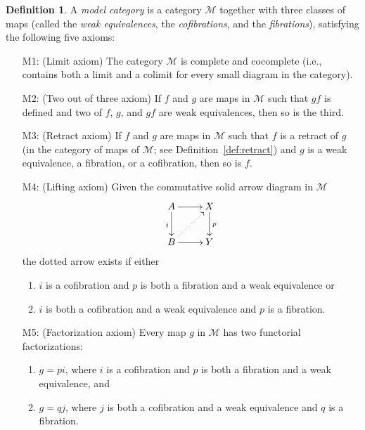 \documentclass{amsart}
\numberwithin{equation}{section}
\theoremstyle{slplain}
\theoremstyle{definition}
\newtheorem{defn}[equation]{Definition} %
\theoremstyle{remark}
\newcommand{\defref}{Definition~\ref}
\newcommand{\cat}[1]{\mathcal{#1}}
\begin{document}
\begin{defn}
  \label{def:ModCat}
  A \emph{model category} is a category $\cat M$ together with three
  classes of maps (called the \emph{weak equivalences}, the
  \emph{cofibrations}, and the \emph{fibrations}), satisfying the
  following five axioms:
  \begin{itemize}
  \item[M1:] (Limit axiom) The category $\cat M$ is complete and
    cocomplete (i.e., contains both a limit and a colimit for every
    small diagram in the category).
  \item[M2:] (Two out of three axiom) If $f$ and $g$ are maps in $\cat
    M$ such that $gf$ is defined and two of $f$, $g$, and $gf$ are
    weak equivalences, then so is the third.
  \item[M3:] (Retract axiom) If $f$ and $g$ are maps in $\cat M$ such
    that $f$ is a retract of $g$ (in the category of maps of $\cat M$;
    see \defref{def:retract}) and $g$ is a weak equivalence, a
    fibration, or a cofibration, then so is $f$.
  \item[M4:] (Lifting axiom) Given the commutative solid arrow diagram
    in $\cat M$
    \begin{displaymath}
      \xymatrix{
        {A} \ar[r] \ar[d]_{i} 
          & {X} \ar[d]^{p}\\
        {B} \ar@{.>}[ur] \ar[r]  
          & {Y}
      }
    \end{displaymath}
    the dotted arrow exists if either
    \begin{enumerate}
    \item $i$ is a cofibration and $p$ is both a fibration and a weak
      equivalence or
    \item $i$ is both a cofibration and a weak equivalence and $p$ is
      a fibration.
    \end{enumerate}
  \item[M5:] (Factorization axiom) Every map $g$ in $\cat M$ has two
    functorial factorizations:
    \begin{enumerate}
    \item $g = pi$, where $i$ is a cofibration and $p$ is both a
      fibration and a weak equivalence, and
    \item $g = qj$, where $j$ is both a cofibration and a weak
      equivalence and $q$ is a fibration.
    \end{enumerate}
  \end{itemize}
\end{defn}
\end{document}
